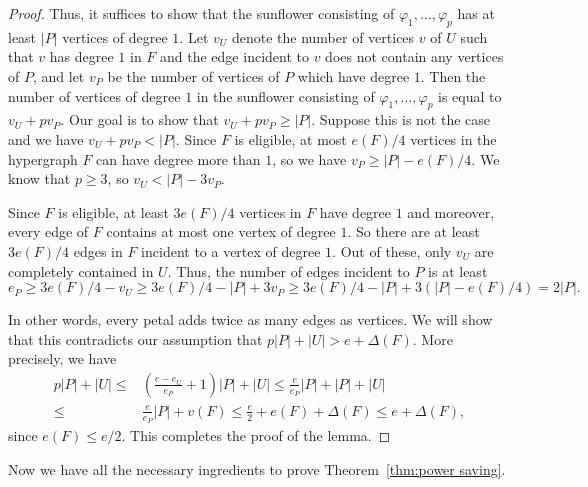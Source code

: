 \begin{proof}
Thus, it suffices to show that the sunflower consisting of $\varphi_1, \dots, \varphi_p$ has at least $|P|$ vertices of degree $1$. Let $v_U$ denote the number of vertices $v$ of $U$ such that $v$ has degree $1$ in $F$ and the edge incident to $v$ does not contain any vertices of $P$, and let $v_P$ be the number of vertices of $P$ which have degree $1$. Then the number of vertices of degree $1$ in the sunflower consisting of $\varphi_1,\dots,\varphi_p$ is equal to $v_U+pv_P$. Our goal is to show that $v_U+pv_P\geq |P|$. Suppose this is not the case and we have $v_U+pv_P<|P|$. Since $F$ is eligible, at most $e(F)/4$ vertices in the hypergraph $F$ can have degree more than $1$, so we have $v_P\geq |P|-e(F)/4$. We know that $p\geq 3$, so $v_U <  |P|-3v_P$.

Since $F$ is eligible, at least $3e(F)/4$ vertices in $F$ have degree $1$ and moreover, every edge of $F$ contains at most one vertex of degree $1$. So there are at least $3e(F)/4$ edges in $F$ incident to a vertex of degree $1$. Out of these, only $v_U$ are completely contained in $U$. Thus, the number of edges incident to $P$ is at least \[e_P\geq 3e(F)/4-v_U\geq 3e(F)/4-|P|+3v_P\geq 3e(F)/4-|P|+3(|P|-e(F)/4)=2|P|.\] 

In other words, every petal adds twice as many edges as vertices. We will show that this contradicts our assumption that $p|P| + |U| > e + \Delta(F)$. More precisely, we have 
\begin{align*}
p|P|+|U|\leq &\left(\frac{e-e_U}{e_P}+1\right)|P| +|U|\leq \frac{e}{e_P}|P|+|P|+|U|\\
\leq & \frac{e}{e_P}|P|+v(F)\leq \frac{e}{2}+e(F)+\Delta(F)\leq e+\Delta(F),
\end{align*}
since $e(F) \le e/2$. This completes the proof of the lemma.
\end{proof}

Now we have all the necessary ingredients to prove Theorem~\ref{thm:power saving}.

